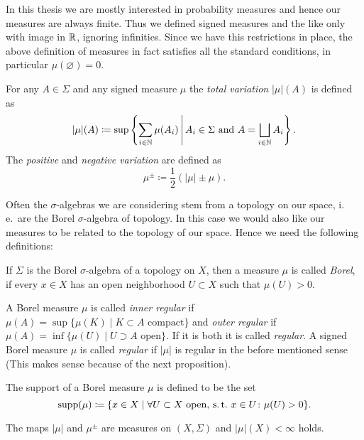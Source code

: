 \begin{rem}
  In this thesis we are mostly interested in probability measures and hence our measures are always finite. Thus we defined signed measures and the like only with image in \(\mathbb{R}\), ignoring infinities. Since we have this restrictions in place, the above definition of measures in fact satisfies all the standard conditions, in particular \(\mu(\varnothing) = 0\).
\end{rem}

\begin{defin}
    For any \(A \in \Sigma\) and any signed measure \(\mu\) the \emph{total variation} \(|\mu|(A)\) is defined as
  \[
    |\mu|(A) \coloneqq \sup \left\{\sum_{i \in \mathbb{N}} \mu(A_i) \,\middle|\, A_i \in \Sigma \text{ and } A = \bigsqcup_{i \in \mathbb{N}} A_i \right \}.
  \]
  The \emph{positive} and \emph{negative variation} are defined as
  \[
    \mu^\pm \coloneqq \frac12 (|\mu| \pm \mu).
  \]
\end{defin}

Often the \(\sigma\)-algebras we are considering stem from a topology on our space, i.\,e.\ are the Borel \(\sigma\)-algebra of topology. In this case we would also like our measures to be related to the topology of our space. Hence we need the following definitions:

\begin{defin}
  If \(\Sigma\) is the Borel \(\sigma\)-algebra of a topology on \(X\), then a measure \(\mu\) is called \emph{Borel}, if every \(x \in X\) has an open neighborhood \(U \subset X\) such that \(\mu(U) > 0\).
  
  A Borel measure \(\mu\) is called \emph{inner regular} if \(\mu(A) = \sup \{ \mu(K) \mid K \subset A \text{ compact}\}\) and \emph{outer regular} if \(\mu(A) = \inf \{ \mu(U) \mid U \supset A \text{ open}\}\). If it is both it is called \emph{regular}. A signed Borel measure \(\mu\) is called \emph{regular} if \(|\mu|\) is regular in the before mentioned sense (This makes sense because of the next proposition).

  The support of a Borel measure \(\mu\) is defined to be the set
  \[
    \operatorname{supp}(\mu) \coloneqq \{x \in X \mid \forall U \subset X \text{ open, s.\,t.\ } x \in U\colon \mu(U) > 0\}.
  \]
\end{defin}

\begin{prop}
  The maps \(|\mu|\) and \(\mu^\pm\) are measures on \((X, \Sigma)\) and \(|\mu|(X) < \infty\) holds.
\end{prop}

